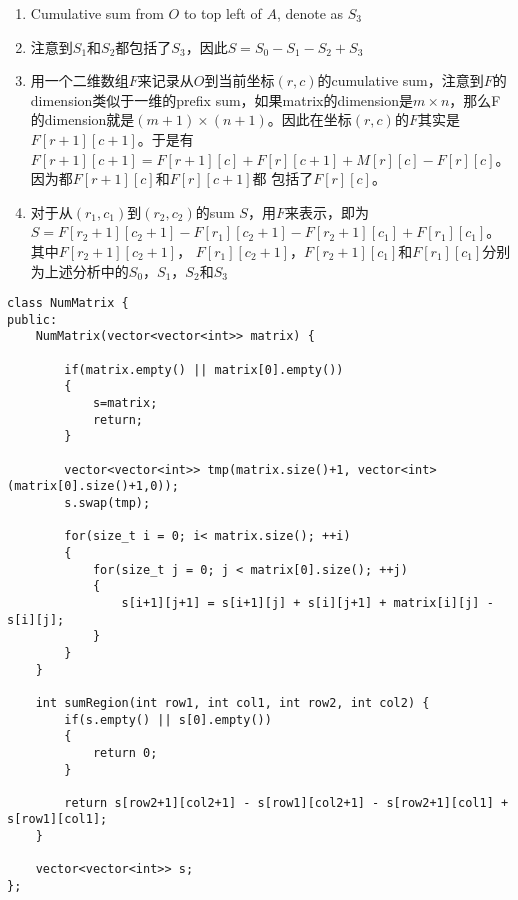 \begin{enumerate}
\begin{figure}[H]
\end{figure}
\item Cumulative sum from $O$ to top left of $A$, denote as $S_3$
\begin{figure}[H]
\end{figure}
\item 注意到$S_1$和$S_2$都包括了$S_3$，因此$S=S_0-S_1-S_2+S_3$
\item 用一个二维数组$F$来记录从$O$到当前坐标$(r,c)$的cumulative sum，注意到$F$的dimension类似于一维的prefix sum，如果matrix的dimension是$m\times n$，那么F的dimension就是$(m+1)\times(n+1)$。因此在坐标$(r,c)$的$F$其实是$F[r+1][c+1]$。于是有$F[r+1][c+1]=F[r+1][c]+F[r][c+1]+M[r][c]-F[r][c]$。因为都$F[r+1][c]$和$F[r][c+1]$都
包括了$F[r][c]$。
\item 对于从$(r_1,c_1)$到$(r_2,c_2)$的sum $S$，用$F$来表示，即为$S=F[r_2+1][c_2+1] - F[r_1][c_2+1] - F[r_2+1][c_1] + F[r_1][c_1]$。其中$F[r_2+1][c_2+1]$， $F[r_1][c_2+1]$，$F[r_2+1][c_1]$和$F[r_1][c_1]$分别为上述分析中的$S_0$，$S_1$，$S_2$和$S_3$
\end{enumerate}
\setcounter{lstlisting}{0}
\begin{lstlisting}[style=customc, caption={Caching}]
class NumMatrix {
public:
    NumMatrix(vector<vector<int>> matrix) {
        
        if(matrix.empty() || matrix[0].empty())
        {
            s=matrix;
            return;
        }
        
        vector<vector<int>> tmp(matrix.size()+1, vector<int>(matrix[0].size()+1,0));
        s.swap(tmp);
        
        for(size_t i = 0; i< matrix.size(); ++i)
        {
            for(size_t j = 0; j < matrix[0].size(); ++j)
            {
                s[i+1][j+1] = s[i+1][j] + s[i][j+1] + matrix[i][j] - s[i][j];
            }
        }
    }
    
    int sumRegion(int row1, int col1, int row2, int col2) {
        if(s.empty() || s[0].empty())
        {
            return 0;
        }
        
        return s[row2+1][col2+1] - s[row1][col2+1] - s[row2+1][col1] + s[row1][col1];
    }
    
    vector<vector<int>> s;
};
\end{lstlisting}